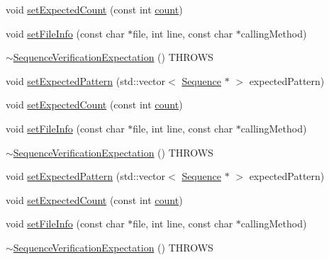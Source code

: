 \begin{DoxyCompactItemize}
\item 
void \mbox{\hyperlink{structfakeit_1_1SequenceVerificationExpectation_aeb5a9670fec5f1c6174bd5206074d428}{set\+Expected\+Count}} (const int \mbox{\hyperlink{gmock__stress__test_8cc_afd9db40e3361ae09188795e8cbe19752}{count}})
\item 
void \mbox{\hyperlink{structfakeit_1_1SequenceVerificationExpectation_af6ca6f44173d64798ddc99d494c40c2f}{set\+File\+Info}} (const char $\ast$file, int line, const char $\ast$calling\+Method)
\item 
\mbox{\hyperlink{structfakeit_1_1SequenceVerificationExpectation_a2378bd3fa4b42806ced08be01261d9ab}{$\sim$\+Sequence\+Verification\+Expectation}} () T\+H\+R\+O\+WS
\item 
void \mbox{\hyperlink{structfakeit_1_1SequenceVerificationExpectation_acf31012cd30a4213e3fb927549525c7d}{set\+Expected\+Pattern}} (std\+::vector$<$ \mbox{\hyperlink{classfakeit_1_1Sequence}{Sequence}} $\ast$ $>$ expected\+Pattern)
\item 
void \mbox{\hyperlink{structfakeit_1_1SequenceVerificationExpectation_aeb5a9670fec5f1c6174bd5206074d428}{set\+Expected\+Count}} (const int \mbox{\hyperlink{gmock__stress__test_8cc_afd9db40e3361ae09188795e8cbe19752}{count}})
\item 
void \mbox{\hyperlink{structfakeit_1_1SequenceVerificationExpectation_af6ca6f44173d64798ddc99d494c40c2f}{set\+File\+Info}} (const char $\ast$file, int line, const char $\ast$calling\+Method)
\item 
\mbox{\hyperlink{structfakeit_1_1SequenceVerificationExpectation_a2378bd3fa4b42806ced08be01261d9ab}{$\sim$\+Sequence\+Verification\+Expectation}} () T\+H\+R\+O\+WS
\item 
void \mbox{\hyperlink{structfakeit_1_1SequenceVerificationExpectation_acf31012cd30a4213e3fb927549525c7d}{set\+Expected\+Pattern}} (std\+::vector$<$ \mbox{\hyperlink{classfakeit_1_1Sequence}{Sequence}} $\ast$ $>$ expected\+Pattern)
\item 
void \mbox{\hyperlink{structfakeit_1_1SequenceVerificationExpectation_aeb5a9670fec5f1c6174bd5206074d428}{set\+Expected\+Count}} (const int \mbox{\hyperlink{gmock__stress__test_8cc_afd9db40e3361ae09188795e8cbe19752}{count}})
\item 
void \mbox{\hyperlink{structfakeit_1_1SequenceVerificationExpectation_af6ca6f44173d64798ddc99d494c40c2f}{set\+File\+Info}} (const char $\ast$file, int line, const char $\ast$calling\+Method)
\item 
\mbox{\hyperlink{structfakeit_1_1SequenceVerificationExpectation_a2378bd3fa4b42806ced08be01261d9ab}{$\sim$\+Sequence\+Verification\+Expectation}} () T\+H\+R\+O\+WS

\end{DoxyCompactItemize}
